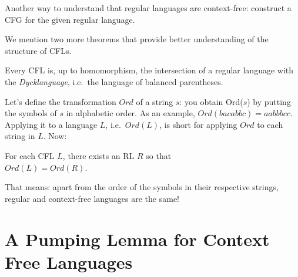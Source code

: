 \begin{exercise}\label{dfaiscfg}
Another way to understand that regular languages are context-free: construct a CFG for the given regular language.
\end{exercise}

We mention two more theorems that provide better understanding of the structure of CFLs.

\begin{theorem}
Every CFL is, up to homomorphism, the intersection of a regular language with the {\em Dyck\footnotemark language}, i.e.\ the language of balanced parentheses.
\end{theorem}
Let's define the transformation $Ord$ of a string $s$: you obtain Ord($s$) by putting the symbols of $s$ in alphabetic order. As an example, $Ord(bacabbc) = aabbbcc$. Applying it to a language $L$, i.e.\ $Ord(L)$, is short for applying $Ord$ to each string in $L$. Now:
\begin{theorem}[Parikh]
	For each CFL $L$, there exists an RL $R$ so that \\ $Ord(L) = Ord(R)$.
\end{theorem}
That means: apart from the order of the symbols in their respective
strings, regular and context-free languages are the same!



\section{A Pumping Lemma for Context Free Languages}\label{pompcfl}
